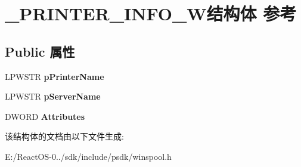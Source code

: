 \hypertarget{struct___p_r_i_n_t_e_r___i_n_f_o__4_w}{}\section{\+\_\+\+P\+R\+I\+N\+T\+E\+R\+\_\+\+I\+N\+F\+O\+\_\+W结构体 参考}
\label{struct___p_r_i_n_t_e_r___i_n_f_o__4_w}
\subsection*{Public 属性}
\begin{DoxyCompactItemize}
\item 
\mbox{\label{struct___p_r_i_n_t_e_r___i_n_f_o__4_w_afc4a7e65e3828fd88cf4ec12eb5d4292}} 
L\+P\+W\+S\+TR {\bfseries p\+Printer\+Name}
\item 
\mbox{\label{struct___p_r_i_n_t_e_r___i_n_f_o__4_w_ac61dae56cc350173492a8045b5967743}} 
L\+P\+W\+S\+TR {\bfseries p\+Server\+Name}
\item 
\mbox{\label{struct___p_r_i_n_t_e_r___i_n_f_o__4_w_a01fc999330cc045270e7e13e682e6f68}} 
D\+W\+O\+RD {\bfseries Attributes}
\end{DoxyCompactItemize}


该结构体的文档由以下文件生成\+:\begin{DoxyCompactItemize}
\item 
E\+:/\+React\+O\+S-\/0../sdk/include/psdk/winspool.\+h\end{DoxyCompactItemize}
